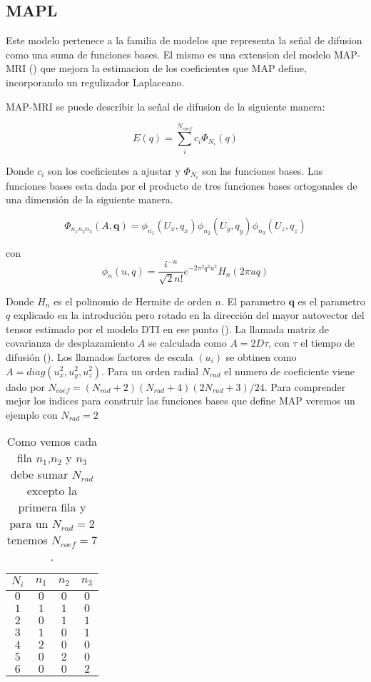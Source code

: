 \documentclass[11pt,a4paper,twoside]{tesis}
\begin{document}
\subsection{MAPL}
Este modelo pertenece a la familia de modelos que representa la se\~nal de difusion como una suma 
de funciones bases. El mismo es una extension del modelo MAP-MRI (\citet{Ozarslan2013}) que mejora 
la estimacion de los coeficientes que MAP define, incorporando un regulizador Laplaceano. 

MAP-MRI se puede describir la se\~nal de difusion de la siguiente manera:

\begin{equation}
    E(q) = \sum_{i}^{N_{coef}} c_i \Phi_{N_i}(q)
\end{equation}

Donde ${c_i}$ son los coeficientes a ajustar y $\Phi_{N_i}$ son las funciones bases. Las funciones 
bases esta dada por el producto de tres funciones bases  ortogonales de una dimensi\'on de la 
siguiente manera.

$$
    \Phi_{n_1 n_2 n_3} (A, \mathbf{q}) = \phi_{n_1}(U_x, q_x) \phi_{n_2}(U_y, q_y) 
\phi_{n_3}(U_z, q_z)$$
  
con   
$$\phi_n(u, q) = \frac{i^{-n}}{\sqrt{2} n!} e^{-2\pi^2q^2u^2} H_n(2\pi u q)$$

Donde $H_n$ es el polinomio de Hermite de orden $n$. El parametro $\mathbf{q}$ es el parametro $q$ 
explicado en la introduci\'on pero rotado en la direcci\'on del mayor autovector del tensor 
estimado por el modelo DTI en ese punto (\citep{Basser1994}). La llamada matriz de 
covarianza de desplazamiento $A$ se calculada como $A=2D\tau$, con $\tau$ el tiempo de difusi\'on 
(\citep{Basser2002}). Los llamados factores de escala $(u_i)$ se obtinen como 
$A=diag(u_x^2,u_y^2,u_z^2)$. Para un orden radial $N_{rad}$ el numero de coeficiente viene dado por 
$N_{coef} = (N_{rad}+2)(N_{rad}+4)(2N_{rad}+3)/24$. Para comprender mejor los indices para 
construir las funciones bases que define MAP veremos un ejemplo con $N_{rad}=2$

\begin{table}[H]
\begin{tabular}{|c|c|c|c|}
\hline
$N_i$ & $n_1$ & $n_2$ & $n_3$ \\
\hline
$0$ & $0$ & $0$ & $0$\\
$1$ & $1$ & $1$ & $0$\\
$2$ & $0$ & $1$ & $1$\\
$3$ & $1$ & $0$ & $1$\\
$4$ & $2$ & $0$ & $0$\\
$5$ & $0$ & $2$ & $0$\\
$6$ & $0$ & $0$ & $2$\\
\hline
\end{tabular}

\caption{Como vemos cada fila $n_1$,$n_2$ y $n_3$ debe sumar $N_{rad}$ excepto la primera fila y 
para un $N_{rad}=2$ tenemos $N_{coef}=7$.}

\label{tab:res}
\end{table}
\end{document}
